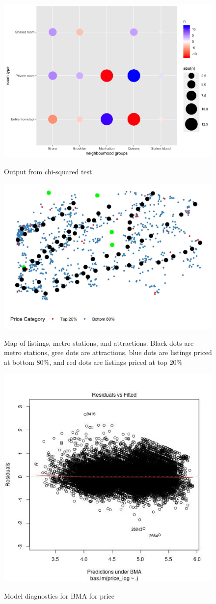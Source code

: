 \documentclass[10pt]{jmlr}%
\begin{document}
\begin{figure}[htbp]
	\centering
	\caption{Output from chi-squared test.}
	\includegraphics[width=0.5\linewidth]{room_type.jpeg}
	\label{fig:room_type}
\end{figure}

\begin{figure}[htbp]
	\centering
	\caption{Map of listings, metro stations, and attractions. Black dots are metro stations, gree dots are attractions, blue dots are listings priced at bottom 80\%, and red dots are listings priced at top 20\%}
	\includegraphics[width=0.5\linewidth]{map_eda.jpeg}
	\label{fig:map_eda}
\end{figure}

\begin{figure}[htbp]
	\centering
	\caption{Model diagnostics for BMA for price}
	\includegraphics[width=0.5\linewidth]{price_diagnostic_plot.jpeg}
	\label{fig:price_diag}
\end{figure}
\end{document}
